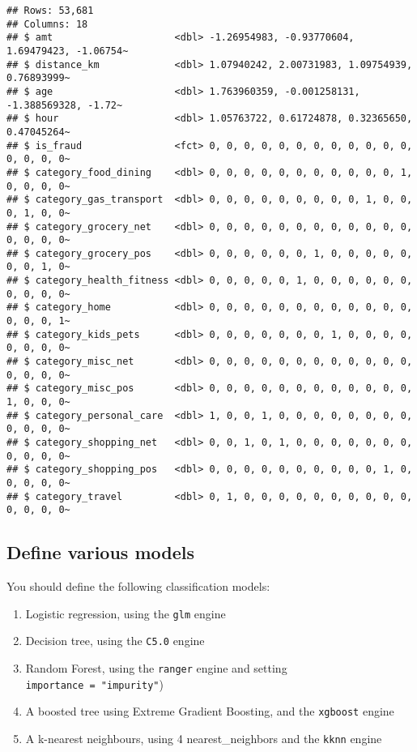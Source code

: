 \documentclass[
]{article}
\providecommand{\tightlist}{%
  \setlength{\itemsep}{0pt}\setlength{\parskip}{0pt}}
\begin{document}
\begin{verbatim}
## Rows: 53,681
## Columns: 18
## $ amt                     <dbl> -1.26954983, -0.93770604, 1.69479423, -1.06754~
## $ distance_km             <dbl> 1.07940242, 2.00731983, 1.09754939, 0.76893999~
## $ age                     <dbl> 1.763960359, -0.001258131, -1.388569328, -1.72~
## $ hour                    <dbl> 1.05763722, 0.61724878, 0.32365650, 0.47045264~
## $ is_fraud                <fct> 0, 0, 0, 0, 0, 0, 0, 0, 0, 0, 0, 0, 0, 0, 0, 0~
## $ category_food_dining    <dbl> 0, 0, 0, 0, 0, 0, 0, 0, 0, 0, 0, 1, 0, 0, 0, 0~
## $ category_gas_transport  <dbl> 0, 0, 0, 0, 0, 0, 0, 0, 0, 1, 0, 0, 0, 1, 0, 0~
## $ category_grocery_net    <dbl> 0, 0, 0, 0, 0, 0, 0, 0, 0, 0, 0, 0, 0, 0, 0, 0~
## $ category_grocery_pos    <dbl> 0, 0, 0, 0, 0, 0, 1, 0, 0, 0, 0, 0, 0, 0, 1, 0~
## $ category_health_fitness <dbl> 0, 0, 0, 0, 0, 1, 0, 0, 0, 0, 0, 0, 0, 0, 0, 0~
## $ category_home           <dbl> 0, 0, 0, 0, 0, 0, 0, 0, 0, 0, 0, 0, 0, 0, 0, 1~
## $ category_kids_pets      <dbl> 0, 0, 0, 0, 0, 0, 0, 1, 0, 0, 0, 0, 0, 0, 0, 0~
## $ category_misc_net       <dbl> 0, 0, 0, 0, 0, 0, 0, 0, 0, 0, 0, 0, 0, 0, 0, 0~
## $ category_misc_pos       <dbl> 0, 0, 0, 0, 0, 0, 0, 0, 0, 0, 0, 0, 1, 0, 0, 0~
## $ category_personal_care  <dbl> 1, 0, 0, 1, 0, 0, 0, 0, 0, 0, 0, 0, 0, 0, 0, 0~
## $ category_shopping_net   <dbl> 0, 0, 1, 0, 1, 0, 0, 0, 0, 0, 0, 0, 0, 0, 0, 0~
## $ category_shopping_pos   <dbl> 0, 0, 0, 0, 0, 0, 0, 0, 0, 0, 1, 0, 0, 0, 0, 0~
## $ category_travel         <dbl> 0, 1, 0, 0, 0, 0, 0, 0, 0, 0, 0, 0, 0, 0, 0, 0~
\end{verbatim}

\hypertarget{define-various-models}{%
\subsection{Define various models}\label{define-various-models}}

You should define the following classification models:

\begin{enumerate}
\def\labelenumi{\arabic{enumi}.}
\tightlist
\item
  Logistic regression, using the \texttt{glm} engine
\item
  Decision tree, using the \texttt{C5.0} engine
\item
  Random Forest, using the \texttt{ranger} engine and setting
  \texttt{importance\ =\ "impurity"})\\
\item
  A boosted tree using Extreme Gradient Boosting, and the
  \texttt{xgboost} engine
\item
  A k-nearest neighbours, using 4 nearest\_neighbors and the
  \texttt{kknn} engine
\end{enumerate}
\end{document}
